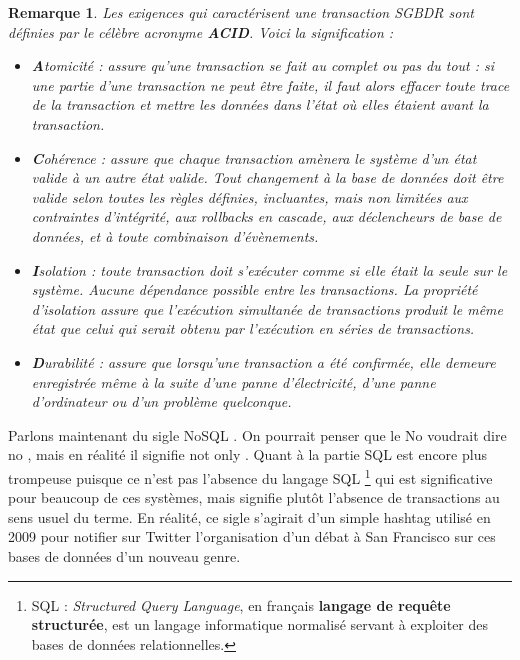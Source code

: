\documentclass[12pt]{article}
\newtheorem*{req}{Remarque}
\begin{document}
\begin{req}
Les exigences qui caractérisent une transaction SGBDR sont définies par le célèbre acronyme \textbf{ACID}. Voici la signification : 
\begin{itemize}
\item \textbf{A}tomicité : assure qu'une transaction se fait au complet ou pas du tout : si une partie d'une transaction ne peut être faite, il faut alors effacer toute trace de la transaction et mettre les données dans l'état où elles étaient avant la transaction.
\item \textbf{C}ohérence : assure que chaque transaction amènera le système d'un état valide à un autre état valide. Tout changement à la base de données doit être valide selon toutes les règles définies, incluantes, mais non limitées aux contraintes d'intégrité, aux rollbacks en cascade, aux déclencheurs de base de données, et à toute combinaison d'évènements.
\item \textbf{I}solation : toute transaction doit s'exécuter comme si elle était la seule sur le système. Aucune dépendance possible entre les transactions. La propriété d'isolation assure que l'exécution simultanée de transactions produit le même état que celui qui serait obtenu par l'exécution en séries de transactions.
\item \textbf{D}urabilité : assure que lorsqu'une transaction a été confirmée, elle demeure enregistrée même à la suite d'une panne d'électricité, d'une panne d'ordinateur ou d'un problème quelconque.
\end{itemize}
\end{req}
Parlons maintenant du sigle \og NoSQL \fg . On pourrait penser que le \og No \fg voudrait dire \og no \fg , mais en réalité il signifie \og not only \fg . Quant à la partie \og SQL \fg est encore plus trompeuse puisque ce n'est pas l'absence du langage SQL \footnote{SQL : \emph{Structured Query Language}, en français \textbf{langage de requête structurée}, est un langage informatique normalisé servant à exploiter des bases de données relationnelles.} qui est significative pour beaucoup de ces systèmes, mais signifie plutôt l'absence de transactions au sens usuel du terme. En réalité, ce sigle s'agirait d'un simple hashtag utilisé en 2009 pour notifier sur Twitter l'organisation d'un débat à San Francisco sur ces bases de données d'un nouveau genre.
\end{document}

